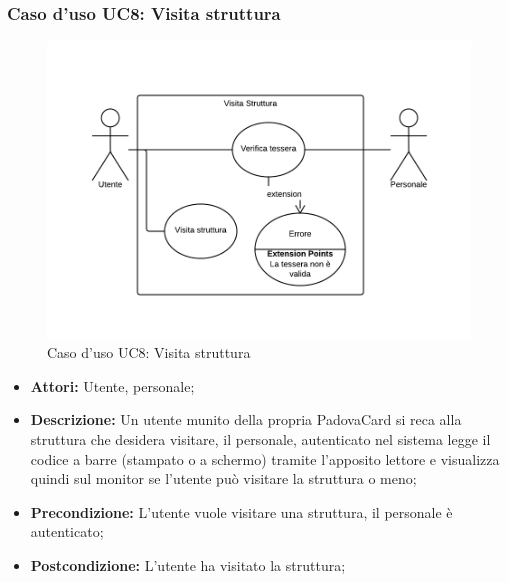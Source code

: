 \subsubsection{Caso d'uso UC8: Visita struttura}
\begin{figure}[H]
\centering
\includegraphics[width=1\textwidth]{images/UC8.png}
\caption{Caso d'uso UC8: Visita struttura}
\end{figure}
\begin{itemize}
\item \textbf{Attori:} Utente, personale;
\item \textbf{Descrizione:} Un utente munito della propria PadovaCard si reca alla struttura che desidera visitare, il personale, autenticato nel sistema legge il codice a barre (stampato o a schermo) tramite l'apposito lettore e visualizza quindi sul monitor se l'utente può visitare la struttura o meno;
\item \textbf{Precondizione:} L'utente vuole visitare una struttura, il personale è autenticato;
\item \textbf{Postcondizione:}  L'utente ha visitato la struttura;
\end{itemize}


